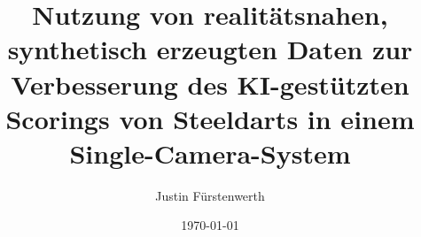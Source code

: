 
\title{Nutzung von realitätsnahen, synthetisch erzeugten Daten zur Verbesserung des KI-gestützten Scorings von Steeldarts in einem Single-Camera-System}
\author{Justin Fürstenwerth}
\date{\today}
\maketitle

